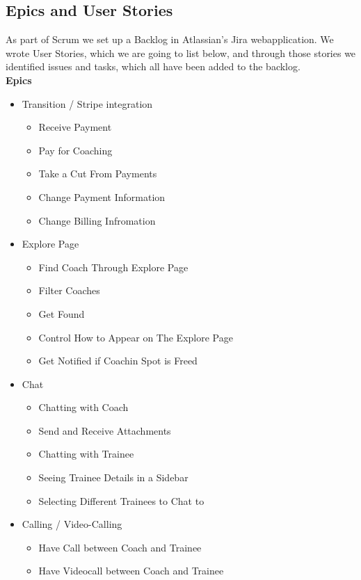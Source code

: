 \subsection{Epics and User Stories}
As part of Scrum we set up a Backlog in Atlassian's Jira webapplication. We wrote User Stories, which we are going to list below, and through those stories we identified issues and tasks, which all have been added to the backlog. \\
\textbf{Epics}
\begin{itemize}

    \item Transition / Stripe integration
    \begin{itemize}
        \item Receive Payment
        \item Pay for Coaching
        \item Take a Cut From Payments
        \item Change Payment Information
        \item Change Billing Infromation
    \end{itemize}

    \item Explore Page
    \begin{itemize}
        \item Find Coach Through Explore Page
        \item Filter Coaches
        \item Get Found
        \item Control How to Appear on The Explore Page
        \item Get Notified if Coachin Spot is Freed
    \end{itemize}

    \item Chat
    \begin{itemize}
        \item Chatting with Coach
        \item Send and Receive Attachments
        \item Chatting with Trainee
        \item Seeing Trainee Details in a Sidebar
        \item Selecting Different Trainees to Chat to
    \end{itemize}

    \item Calling / Video-Calling
    \begin{itemize}
        \item Have Call between Coach and Trainee
        \item Have Videocall between Coach and Trainee
    \end{itemize}


\end{itemize}
